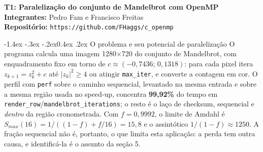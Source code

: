 \documentclass[10pt,a4paper]{article}
\makeatletter
\renewcommand\section{\@startsection{section}{1}{\z@}%
  {-1.4ex \@plus -.3ex \@minus -.2ex}{0.4ex \@plus .2ex}%
  {\normalfont\normalsize\bfseries}}
\makeatother
\begin{document}
{\large\textbf{T1: Paralelização do conjunto de Mandelbrot com OpenMP}}\\[2pt]
\textbf{Integrantes:} Pedro Fam e Francisco Freitas \hfill \\
\textbf{Repositório:} \texttt{https://github.com/FHaggs/c\_openmp} 

\section{O problema e seu potencial de paralelização}
O programa calcula uma imagem 1280$\times$720 do conjunto de Mandelbrot, com enquadramento fixo em torno de $c\approx(-0{,}7436;\,0{,}1318)$: para cada pixel itera $z_{k+1}=z_k^2+c$ até $|z_k|^2\ge4$ ou atingir \texttt{max\_iter}, e converte a contagem em cor. O perfil com \texttt{perf} sobre o caminho sequencial, levantado na mesma entrada e sobre a mesma região usada no speed-up, concentra \textbf{99,92\%} do tempo em \texttt{render\_row}/\texttt{mandelbrot\_iterations}; o resto é o laço de checksum, sequencial e \emph{dentro} da região cronometrada. Com $f=0{,}9992$, o limite de Amdahl é $S_{max}(16)=1/((1-f)+f/16)=15{,}8$ e o assintótico $1/(1-f)\approx1250$. A fração sequencial não é, portanto, o que limita esta aplicação: a perda tem outra causa, e identificá-la é o assunto da seção 5.
\end{document}
